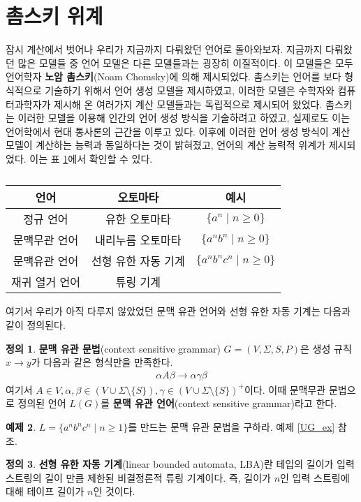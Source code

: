 \documentclass[b5paper, 10pt]{book}
\theoremstyle{definition}
\newtheorem{defn}{정의}[chapter]
\newtheorem{ex}[defn]{예제}
\begin{document}
\section{촘스키 위계}
잠시 계산에서 벗어나 우리가 지금까지 다뤄왔던 언어로 돌아와보자. 지금까지 다뤄왔던 많은 모델들 중
언어 모델은 다른 모델들과는 굉장히 이질적이다. 이 모델들은 모두 
언어학자 \textbf{노암 촘스키}(Noam Chomsky)에 의해 제시되었다. 촘스키는 언어를 보다 형식적으로
기술하기 위해서 언어 생성 모델을 제시하였고, 이러한 모델은 수학자와 컴퓨터과학자가 제시해 온 여러가지
계산 모델들과는 독립적으로 제시되어 왔었다. 촘스키는 이러한 모델을 이용해 인간의 언어 생성 방식을
기술하려고 하였고, 실제로도 이는 언어학에서 현대 통사론의 근간을 이루고 있다. 이후에 이러한 언어 
생성 방식이 계산 모델이 계산하는 능력과 동일하다는 것이 밝혀졌고, 언어의 계산 능력적 위계가 제시되었다.
이는 표 \ref{chomsky hierarchy}에서 확인할 수 있다.
\begin{table}[h]
    \centering
    \begin{tabular}{|c|c|c|}
    \hline
    \textbf{언어} & \textbf{오토마타} & \textbf{예시} \\ \hline
    정규 언어       & 유한 오토마타       &   $\{ a^n \;\vert\; n\ge 0\}$    \\ \hline
    문맥무관 언어    & 내리누름 오토마타     & $\{ a^n b^n \;\vert\; n\ge 0\}$    \\ \hline
    문맥유관 언어    & 선형 유한 자동 기계   & $\{ a^n b^n c^n \;\vert\; n\ge 0\}$    \\ \hline
    재귀 열거 언어    & 튜링 기계         &   \\ \hline
    \end{tabular}
    \caption{}
    \label{chomsky hierarchy}
\end{table}
여기서 우리가 아직 다루지 않았었던 문맥 유관 언어와 선형 유한 자동 기계는 다음과 같이 정의된다. 
\begin{defn}
    \textbf{문맥 유관 문법}(context sensitive grammar) $G = (V, \Sigma, S, P)$은 생성 규칙
    $x \rightarrow y$가 다음과 같은 형식만을 만족한다.
    \begin{align*}
        \alpha A \beta \rightarrow \alpha \gamma \beta
    \end{align*}
    여기서 $A \in V, \alpha, \beta \in (V \cup \Sigma \setminus \{S\}), 
    \gamma \in (V \cup \Sigma \setminus \{S\})^+$이다.
    이때 문맥무관 문법으로 정의된 언어 $L(G)$를 \textbf{문맥 유관 언어}(context sensitive grammar)라고
    한다.
\end{defn}
\begin{ex}
    $L = \{ a^n b^n c^n \;\vert\; n \ge 1\}$를 만드는 문맥 유관 문법을 구하라. 예제 \ref{UG_ex} 참조.
\end{ex}
\begin{defn}
    \textbf{선형 유한 자동 기계}(linear bounded automata, LBA)란 테입의 길이가 입력 스트링의 길이 만큼 
    제한된 비결정론적 튜링 기계이다. 즉, 길이가 $n$인 입력 스트링에 대해 테이프 길이가 $n$인 것이다.
\end{defn}
\end{document}
